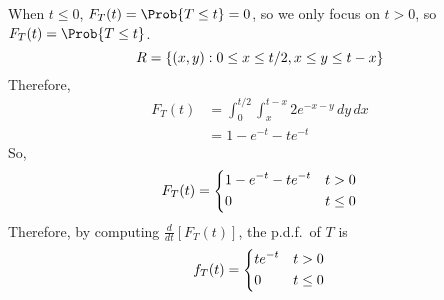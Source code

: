 \begin{Example}{}{}
\begin{enumerate}[label=(\roman*)]
              When $ t\le 0 $, $ F_T(t)=\Prob{T\le t}=0 $,
              so we only focus on $ t>0 $, so $ F_T(t)=\Prob{T\le t} $.
              \[ R=\{(x,y):0\le x\le t/2, x\le y\le t-x\} \]
              Therefore,
              \begin{align*}
                  F_T(t)
                   & = \int_{0}^{t/2} \int_{x}^{t-x} 2e^{-x-y}\, d{y} \, d{x} \\
                   & =1-e^{-t}-te^{-t}
              \end{align*}
              So,
              \[ F_T(t)=
                  \begin{dcases}
                      1-e^{-t}-te^{-t} & t>0    \\
                      0                & t\le 0
                  \end{dcases} \]
              Therefore, by computing $ \displaystyle
                  \frac{d}{dt}[F_T(t)] $, the p.d.f.\ of $ T $ is
              \[ f_T(t)=
                  \begin{dcases}
                      te^{-t} & t> 0   \\
                      0       & t\le 0
                  \end{dcases} \]
    \end{enumerate}
\end{Example}
